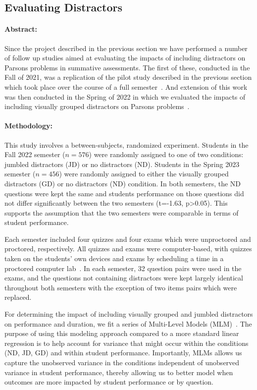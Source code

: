\documentclass[authorversion,nonacm]{acmart}
\begin{document}
\subsection{Evaluating Distractors}\label{sec:parsons}

\paragraph{Abstract:} Since the project described in the previous section we
have performed a number of follow up studies aimed at evaluating the impacts of
including distractors on Parsons problems in summative assessments.  The first
of these, conducted in the Fall of 2021, was a replication of  the pilot study
described in the previous section which took place over the course of a full
semester~\cite{smith2023investigating}. And extension of this work was then
conducted in the Spring of 2022 in which we evaluated the impacts of including
visually grouped distractors on Parsons problems~\cite{smith2023comparing}. 

\paragraph{Methodology:} This study involves a between-subjects, randomized
experiment. Students in the Fall 2022 semester ($n=576$) were randomly assigned
to one of two conditions: jumbled distractors (JD) or no distractors (ND).
Students in the Spring 2023 semester ($n=456$) were randomly assigned to either
the visually grouped distractors (GD) or no distractors (ND) condition. In both
semesters, the ND questions were kept the same and students performance on
those questions did not differ significantly between the two semesters
(t=-1.63, p>0.05). This supports the assumption that the two semesters were
comparable in terms of student performance.


Each semester included four quizzes and four exams which were unproctored and
proctored, respectively. All quizzes and exams were computer-based, with
quizzes taken on the students' own devices and exams by scheduling a time in a
proctored computer lab~\cite{zilles2019every}. In each semester, 32 question
pairs were used in the exams, and the questions not containing distractors were
kept largely identical throughout both semesters with the exception of two
items pairs which were replaced. 

For determining the impact of including visually grouped and jumbled
distractors on performance and duration, we fit a series of Multi-Level Models
(MLM)~\cite{snijders2011multilevel}. The purpose of using this modeling
approach compared to a more standard linear regression is to help account for
variance that might occur within the conditions (ND, JD, GD) and within student
performance. Importantly, MLMs allows us capture the unobserved variance in the
conditions independent of unobserved variance in student performance, thereby
allowing us to better model when outcomes are more impacted by student
performance or by question.
\end{document}

